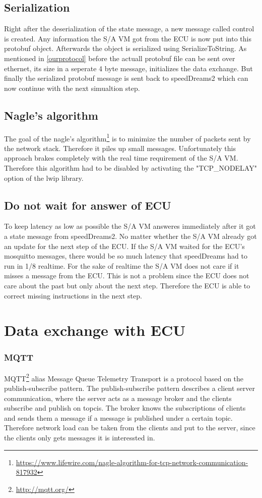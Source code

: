 \documentclass[paper=a4, fontsize=11pt]{scrreprt}
\begin{document}
  \subsection{Serialization}
Right after the deserialization of the state message, a new message called control is created. Any information the S/A VM got from the ECU is now put into this protobuf object. Afterwards the object is serialized using SerializeToString. As mentioned in \ref{ourprotocol} before the actuall protobuf file can be sent over ethernet, its size in a seperate 4 byte message, initializes the data exchange. But finally the serialized protobuf message is sent back to speedDreams2 which can now continue with the next simualtion step.
  \subsection{Nagle's algorithm}
The goal of the nagle's algorithm\footnote{\url{https://www.lifewire.com/nagle-algorithm-for-tcp-network-communication-817932}} is to minimize the number of packets sent by the network stack. Therefore it piles up small messages. Unfortunately this approach brakes completely with the real time requirement of the S/A VM. Therefore this algorithm had to be disabled by activating the "TCP\_NODELAY" option of the lwip library.
  \subsection{Do not wait for answer of ECU}
To keep latency as low as possible the S/A VM answeres immediately after it got a state message from speedDreams2. No matter whether the S/A VM already got an update for the next step of the ECU. If the S/A VM waited for the ECU's mosquitto messages, there would be so much latency that speedDreams had to run in 1/8 realtime. For the sake of realtime the S/A VM does not care if it misses a message from the ECU. This is not a problem since the ECU does not care about the past but only about the next step. Therefore the ECU is able to correct missing instructions in the next step.

\section{Data exchange with ECU}
  \subsubsection{MQTT}
MQTT\footnote{\url{http://mqtt.org/}} alias Message Queue Telemetry Transport is a protocol based on the publish-subscribe pattern.\newline
The publish-subscribe pattern describes a client server communication, where the server acts as a message broker and the clients subscribe and publish on topcis. The broker knows the subscriptions of clients and sends them a message if a message is published under a certain topic. Therefore network load can be taken from the clients and put to the server, since the clients only gets messages it is interessted in.
\end{document}
